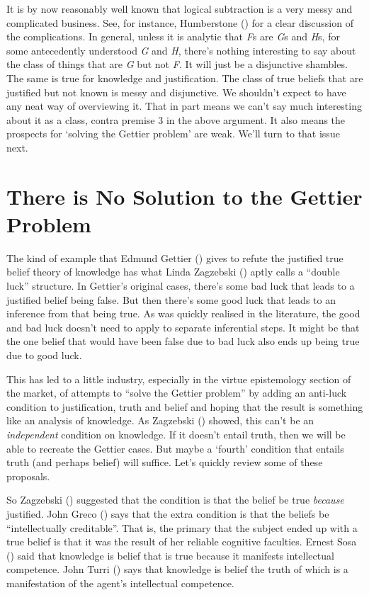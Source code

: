 \documentclass[
  10pt,
  letterpaper,
  DIV=11,
  numbers=noendperiod,
  twoside]{scrartcl}
\begin{document}
It is by now reasonably well known that logical subtraction is a very
messy and complicated business. See, for instance, Humberstone
() for a clear discussion of the
complications. In general, unless it is analytic that \emph{F}s are
\emph{G}s and \emph{H}s, for some antecedently understood \emph{G} and
\emph{H}, there's nothing interesting to say about the class of things
that are \emph{G} but not \emph{F}. It will just be a disjunctive
shambles. The same is true for knowledge and justification. The class of
true beliefs that are justified but not known is messy and disjunctive.
We shouldn't expect to have any neat way of overviewing it. That in part
means we can't say much interesting about it as a class, contra premise
3 in the above argument. It also means the prospects for `solving the
Gettier problem' are weak. We'll turn to that issue next.

\section{There is No Solution to the Gettier
Problem}\label{there-is-no-solution-to-the-gettier-problem}

The kind of example that Edmund Gettier
() gives to refute the justified true
belief theory of knowledge has what Linda Zagzebski
() aptly calls a ``double luck''
structure. In Gettier's original cases, there's some bad luck that leads
to a justified belief being false. But then there's some good luck that
leads to an inference from that being true. As was quickly realised in
the literature, the good and bad luck doesn't need to apply to separate
inferential steps. It might be that the one belief that would have been
false due to bad luck also ends up being true due to good luck.

This has led to a little industry, especially in the virtue epistemology
section of the market, of attempts to ``solve the Gettier problem'' by
adding an anti-luck condition to justification, truth and belief and
hoping that the result is something like an analysis of knowledge. As
Zagzebski () showed, this can't be an
\emph{independent} condition on knowledge. If it doesn't entail truth,
then we will be able to recreate the Gettier cases. But maybe a `fourth'
condition that entails truth (and perhaps belief) will suffice. Let's
quickly review some of these proposals.

So Zagzebski () suggested that the
condition is that the belief be true \emph{because} justified. John
Greco () says that the extra condition is
that the beliefs be ``intellectually creditable''. That is, the primary
that the subject ended up with a true belief is that it was the result
of her reliable cognitive faculties. Ernest Sosa
() said that knowledge is belief that is
true because it manifests intellectual competence. John Turri
() says that knowledge is belief the truth
of which is a manifestation of the agent's intellectual competence.
\end{document}
